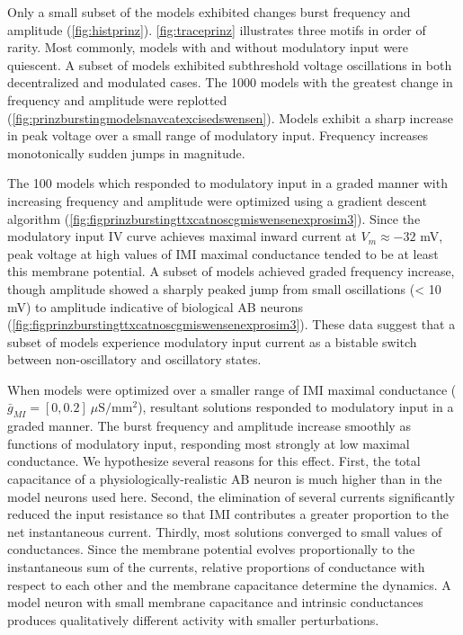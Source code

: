 Only a small subset of the models exhibited changes burst frequency and amplitude (\autoref{fig:histprinz}). \autoref{fig:traceprinz} illustrates three motifs in order of rarity. Most commonly, models with and without modulatory input were quiescent. A subset of models exhibited subthreshold voltage oscillations in both decentralized and modulated cases. The 1000 models with the greatest change in frequency and amplitude were replotted (\autoref{fig:prinzburstingmodelsnavcatexcisedswensen}). Models exhibit a sharp increase in peak voltage over a small range of modulatory input. Frequency increases monotonically sudden jumps in magnitude.

The 100 models which responded to modulatory input in a graded manner with increasing frequency and amplitude were optimized using a gradient descent algorithm (\autoref{fig:figprinzburstingttxcatnoscgmiswensenexprosim3}). Since the modulatory input IV curve achieves maximal inward current at $V_m \approx -32$ mV, peak voltage at high values of \acs{IMI} maximal conductance tended to be at least this membrane potential. A subset of models achieved graded frequency increase, though amplitude showed a sharply peaked jump from small oscillations (< 10 mV) to amplitude indicative of biological \acs{AB} neurons (\autoref{fig:figprinzburstingttxcatnoscgmiswensenexprosim3}). These data suggest that a subset of models experience modulatory input current as a bistable switch between non-oscillatory and oscillatory states.

When models were optimized over a smaller range of \acs{IMI} maximal conductance ($\bar{g}_{MI} = [0, 0.2]~\mu\mathrm{S/mm^2}$), resultant solutions responded to modulatory input in a graded manner. The burst frequency and amplitude increase smoothly as functions of modulatory input, responding most strongly at low maximal conductance. We hypothesize several reasons for this effect. First, the total capacitance of a physiologically-realistic \acs{AB} neuron is much higher than in the model neurons used here\autocite{Soto-TrevinoComputationalmodelelectrically2005,TurrigianoSelectiveregulationcurrent1995}. Second, the elimination of several currents significantly reduced the input resistance so that \acs{IMI} contributes a greater proportion to the net instantaneous current. Thirdly, most solutions converged to small values of conductances. Since the membrane potential evolves proportionally to the instantaneous sum of the currents, relative proportions of conductance with respect to each other and the membrane capacitance determine the dynamics. A model neuron with small membrane capacitance and intrinsic conductances produces qualitatively different activity with smaller perturbations.

